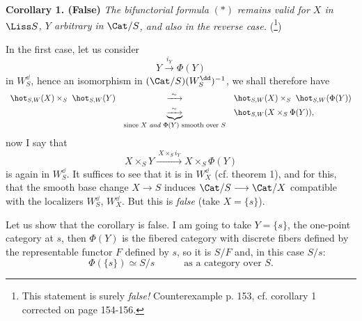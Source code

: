 \textbf{Corollary 1. (False)} \textit{The bifunctorial formula} $(*)$ \textit{remains valid for $X$ in} $\Liss S$\textit{, $Y$ arbitrary in} $\Cat/S$\textit{, and also in the reverse case.} (\footnote[73]{This statement is surely \textit{false!} Counterexample p. 153, cf. corollary 1 corrected on page 154-156.})

In the first case, let us consider
\[
Y \xrightarrow{i_Y} \Phi(Y)
\]
in $W^{\dd}_S$, hence an isomorphism in $(\Cat/S)(W^{\dd}_S)^{-1}$, we shall therefore have
\[
\begin{array}{lcl}
\hot_{S,W}(X) \times_S\ \hot_{S,W}(Y) & \xrightarrow{\ \sim\ } & \hot_{S,W}(X) \times_S\ \hot_{S,W}(\Phi(Y)) \\[1ex]
 & \underbrace{\xrightarrow{\ \sim\ }}_{\text{\footnotesize since $X$ \textit{and} $\Phi(Y)$ smooth over $S$}} & \hot_{S,W}(X \times_S \Phi(Y)),
\end{array}
\]
now I say that
\[
X \times_S Y \xrightarrow{\ X\times_S i_Y\ } X \times_S \Phi(Y)
\]
is again in $W^{\dd}_S$. It suffices to see that it is in $W^{\dd}_X$ (cf. theorem 1), and for this, that the smooth base change $X \longrightarrow S$ induces $\Cat/S \longrightarrow \Cat/X$ compatible with the localizers $W^{\dd}_S$, $W^{\dd}_X$. But this is \textit{false} (take $X = \{s\}$).

Let us show that the corollary is false. I am going to take $Y = \{s\}$, the one-point category at $s$, then $\Phi(Y)$ is the fibered category with discrete fibers defined by the representable functor $F$ defined by $s$, so it is $S/F$ and, in this case $S/s$: %
\[
\Phi(\{s\}) \simeq S/s \qquad\quad \text{as a category over } S.
\]

